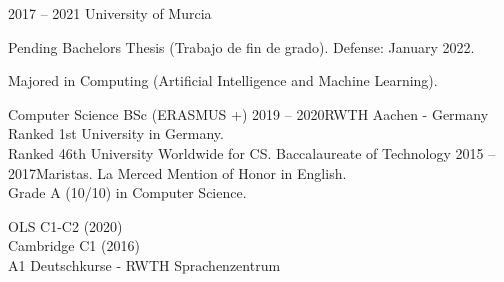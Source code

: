 
{2017 -- 2021 }{University of Murcia}

{
Pending Bachelors Thesis (Trabajo de fin de grado). Defense: January 2022.\newline

Majored in Computing (Artificial Intelligence and Machine Learning). }
\cvevent{} {Computer Science BSc (ERASMUS +)}
{2019 -- 2020}{RWTH Aachen - Germany}
{Ranked 1st University in Germany.\\ Ranked 46th University Worldwide for CS.}
\cvevent{} {Baccalaureate of Technology}
{2015 -- 2017}{Maristas. La Merced}
{Mention of Honor in English.\\}
{Grade A (10/10) in Computer Science.}











\divider



{}
OLS C1-C2 (2020)\\
Cambridge C1 (2016)\\
A1 Deutschkurse - RWTH Sprachenzentrum
\divider


\divider











